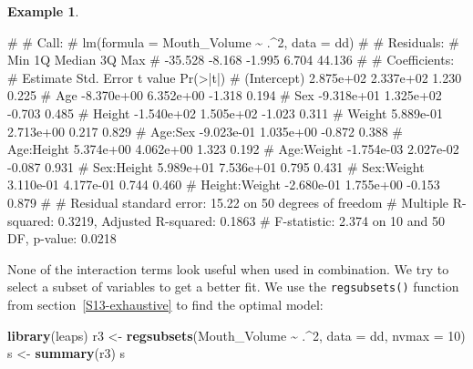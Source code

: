 \documentclass[
  a4paper,
]{article}
\newenvironment{Shaded}{\begin{snugshade}}{\end{snugshade}}
\newcommand{\AttributeTok}[1]{\textcolor[rgb]{0.13,0.29,0.53}{#1}}
\newcommand{\DecValTok}[1]{\textcolor[rgb]{0.00,0.00,0.81}{#1}}
\newcommand{\FunctionTok}[1]{\textcolor[rgb]{0.13,0.29,0.53}{\textbf{#1}}}
\newcommand{\NormalTok}[1]{#1}
\newcommand{\OtherTok}[1]{\textcolor[rgb]{0.56,0.35,0.01}{#1}}
\newcommand{\SpecialCharTok}[1]{\textcolor[rgb]{0.81,0.36,0.00}{\textbf{#1}}}
\theoremstyle{definition}
\theoremstyle{definition}
\newtheorem{example}{Example}[section]
\theoremstyle{definition}
\theoremstyle{definition}
\theoremstyle{remark}
\begin{document}
\begin{example}
\begin{Shaded}
\begin{Highlighting}[]
\NormalTok{\# }
\NormalTok{\# Call:}
\NormalTok{\# lm(formula = Mouth\_Volume \textasciitilde{} .\^{}2, data = dd)}
\NormalTok{\# }
\NormalTok{\# Residuals:}
\NormalTok{\#     Min      1Q  Median      3Q     Max }
\NormalTok{\# {-}35.528  {-}8.168  {-}1.995   6.704  44.136 }
\NormalTok{\# }
\NormalTok{\# Coefficients:}
\NormalTok{\#                 Estimate Std. Error t value Pr(\textgreater{}|t|)}
\NormalTok{\# (Intercept)    2.875e+02  2.337e+02   1.230    0.225}
\NormalTok{\# Age           {-}8.370e+00  6.352e+00  {-}1.318    0.194}
\NormalTok{\# Sex           {-}9.318e+01  1.325e+02  {-}0.703    0.485}
\NormalTok{\# Height        {-}1.540e+02  1.505e+02  {-}1.023    0.311}
\NormalTok{\# Weight         5.889e{-}01  2.713e+00   0.217    0.829}
\NormalTok{\# Age:Sex       {-}9.023e{-}01  1.035e+00  {-}0.872    0.388}
\NormalTok{\# Age:Height     5.374e+00  4.062e+00   1.323    0.192}
\NormalTok{\# Age:Weight    {-}1.754e{-}03  2.027e{-}02  {-}0.087    0.931}
\NormalTok{\# Sex:Height     5.989e+01  7.536e+01   0.795    0.431}
\NormalTok{\# Sex:Weight     3.110e{-}01  4.177e{-}01   0.744    0.460}
\NormalTok{\# Height:Weight {-}2.680e{-}01  1.755e+00  {-}0.153    0.879}
\NormalTok{\# }
\NormalTok{\# Residual standard error: 15.22 on 50 degrees of freedom}
\NormalTok{\# Multiple R{-}squared:  0.3219,  Adjusted R{-}squared:  0.1863 }
\NormalTok{\# F{-}statistic: 2.374 on 10 and 50 DF,  p{-}value: 0.0218}
\end{Highlighting}
\end{Shaded}

None of the interaction terms look useful when used in combination.
We try to select a subset of variables to get a better fit.
We use the \texttt{regsubsets()} function from section~\ref{S13-exhaustive}
to find the optimal model:

\begin{Shaded}
\begin{Highlighting}[]
\FunctionTok{library}\NormalTok{(leaps)}
\NormalTok{r3 }\OtherTok{\textless{}{-}} \FunctionTok{regsubsets}\NormalTok{(Mouth\_Volume }\SpecialCharTok{\textasciitilde{}}\NormalTok{ .}\SpecialCharTok{\^{}}\DecValTok{2}\NormalTok{, }\AttributeTok{data =}\NormalTok{ dd, }\AttributeTok{nvmax =} \DecValTok{10}\NormalTok{)}
\NormalTok{s }\OtherTok{\textless{}{-}} \FunctionTok{summary}\NormalTok{(r3)}
\NormalTok{s}
\end{Highlighting}
\end{Shaded}


\end{example}
\end{document}
